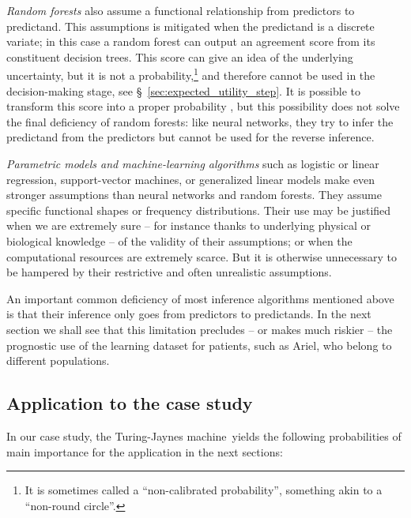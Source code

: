 \documentclass[utf8]{FrontiersinHarvard} %
\newcommand*{\sect}{\S}%
\renewcommand*{\|}[1][]{\nonscript\:#1\vert\nonscript\:\mathopen{}}
\newcommand*{\tjm}{Turing-Jaynes machine}
\begin{document}
\emph{Random forests} also assume a functional relationship from predictors to predictand. This assumptions is mitigated when the predictand is a discrete variate; in this case a random forest can output an agreement score from its constituent decision trees. This score can give an idea of the underlying uncertainty, but it is not a probability,\footnote{It is sometimes called a \enquote{non-calibrated probability}, something akin to a \enquote{non-round circle}.} and therefore cannot be used in the decision-making stage, see \sect~\ref{sec:expected_utility_step}. It is possible to transform this score into a proper probability \citep{dyrlandetal2022b}, but this possibility does not solve the final deficiency of random forests: like neural networks, they try to infer the predictand from the predictors but cannot be used for the reverse inference.

\emph{Parametric models and machine-learning algorithms} such as logistic or linear regression, support-vector machines, or generalized linear models make even stronger assumptions than neural networks and random forests. They assume specific functional shapes or frequency distributions. Their use may be justified when we are extremely sure -- for instance thanks to underlying physical or biological knowledge -- of the validity of their assumptions; or when the computational resources are extremely scarce. But it is otherwise unnecessary to be hampered by their restrictive and often unrealistic assumptions.

\medskip

An important common deficiency of most inference algorithms mentioned above is that their inference only goes from predictors to predictands. In the next section we shall see that this limitation precludes -- or makes much riskier -- the prognostic use of the learning dataset for patients, such as Ariel, who belong to different populations.


\subsection{Application to the case study}
\label{sec:learn_application}

In our case study, the \tjm\ yields the following probabilities of main importance for the  application in the next sections:
  
\end{document}
